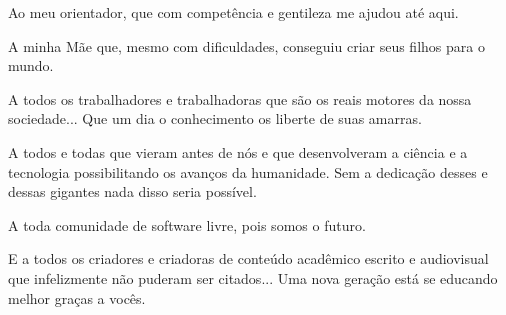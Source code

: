 \begin{agradecimentos}
	\par Ao meu orientador, que com competência e gentileza me ajudou até aqui.

	\par A minha Mãe que, mesmo com dificuldades, conseguiu criar seus filhos para o mundo.

	\par A todos os trabalhadores e trabalhadoras que são os reais motores da nossa sociedade... Que um dia o conhecimento os liberte de suas amarras.

	\par A todos e todas que vieram antes de nós e que desenvolveram a ciência e a tecnologia possibilitando os avanços da humanidade.  Sem a dedicação desses e dessas gigantes nada disso seria possível.
	
	\par A toda comunidade de software livre, pois somos o futuro.
	
	\par E a todos os criadores e criadoras de conteúdo acadêmico escrito e audiovisual que infelizmente não puderam ser citados... Uma nova geração está se educando melhor graças a vocês.

\end{agradecimentos}
